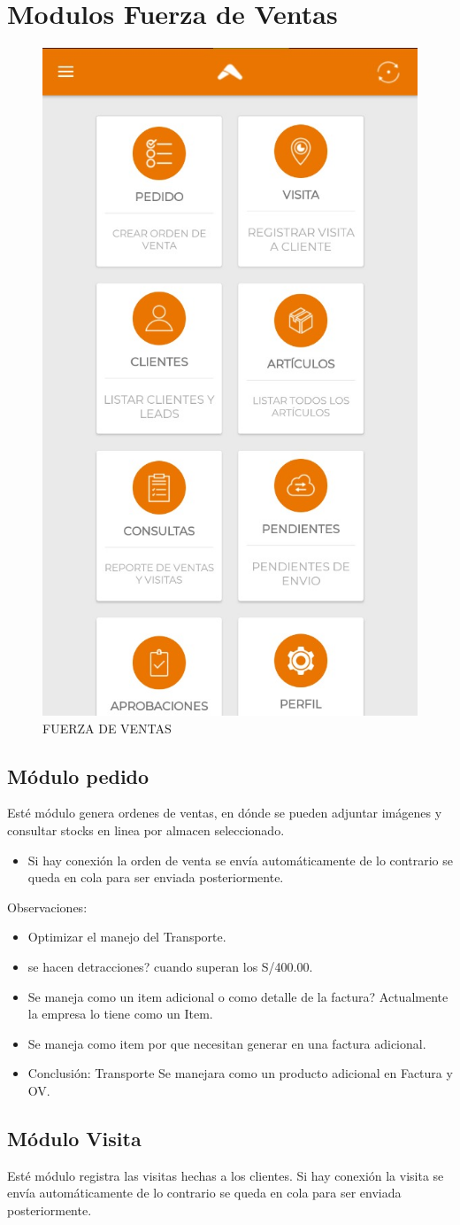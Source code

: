 \documentclass[pdftex,12pt,oneside,a4paper,spanish, english, brazil]{abntex2}
\begin{document}
\begin{sloppypar}
            \chapter{Modulos Fuerza de Ventas}
            \begin{figure}[h!]
            	\centering
            	\caption{FUERZA DE VENTAS} \label{fig:maia}
            	\includegraphics[width=0.2\linewidth,frame=0.5pt 5pt]{img/FV}
            \end{figure}
              \section{Módulo pedido}
              Esté módulo genera ordenes de ventas, en dónde se pueden adjuntar imágenes y consultar stocks en linea por almacen seleccionado.
              \begin{itemize}
              	
              	\item Si hay conexión la orden de venta se envía automáticamente de lo contrario se queda en cola para ser enviada posteriormente.
            \end{itemize}
        Observaciones:
        \begin{itemize}
        	\item  Optimizar el manejo del Transporte.
        	\item  se hacen detracciones? cuando superan los S/400.00.
        	\item  Se maneja como un item adicional o como detalle de la factura? Actualmente la empresa lo tiene como un Item.
        	\item  Se maneja como item por que necesitan generar en una factura adicional.
        	\item Conclusión: Transporte Se manejara como un producto adicional en Factura y OV.
        \end{itemize}
             \section{Módulo Visita}
             Esté módulo registra las visitas hechas a los clientes. Si hay conexión la visita se envía automáticamente de lo contrario se queda en cola para ser enviada posteriormente.
             

\end{sloppypar}
\end{document}
